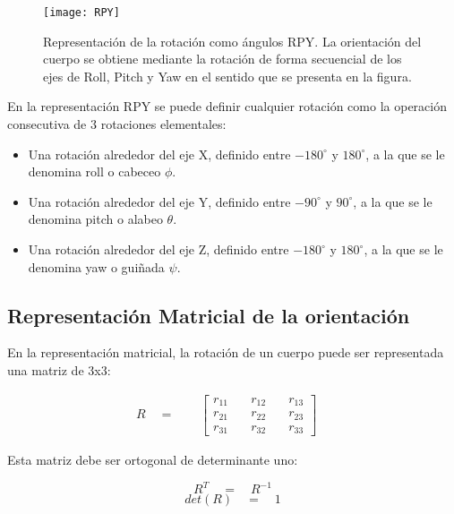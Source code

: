 \begin{figure}[H]
	\centering
	\texttt{[image: RPY]}
	\caption[Representación de la rotación como ángulos  RPY]{Representación de la rotación como ángulos RPY. La orientación del cuerpo se obtiene mediante la rotación de forma secuencial de los ejes de Roll, Pitch y Yaw en el sentido que se presenta en la figura.}
	\label{imagen:rpy}
\end{figure} 

En la representación RPY se puede definir cualquier rotación como la operación consecutiva de 3 rotaciones elementales:



\begin{itemize}
	\item Una rotación alrededor del eje X, definido entre ${-180}^{\circ }$ y ${180}^{\circ }$, a la que se le denomina roll o cabeceo $ \phi$. 
	\item Una rotación alrededor del eje Y, definido entre ${-90}^{\circ }$ y  ${90}^{\circ }$, a la que se le denomina pitch o alabeo $\theta$.
	\item Una rotación alrededor del eje Z, definido entre ${-180}^{\circ }$ y ${180}^{\circ }$, a la que se le denomina yaw o guiñada $\psi$.
	
	
\end{itemize}

\subsection{ Representación Matricial de la orientación }

En la representación matricial, la rotación de un cuerpo puede ser representada una matriz de 3x3:

\begin{equation}
\begin{matrix} R\quad =\quad \quad \begin{bmatrix} { r }_{ 11 } & { \quad r }_{ 12 } & { \quad r }_{ 13 } \\ { r }_{ 21 } & { \quad r }_{ 22 } & { \quad r }_{ 23 } \\ { r }_{ 31 } & { \quad r }_{ 32 } & { \quad r }_{ 33 } \end{bmatrix}\quad  \end{matrix}
\label{eq:MatrizRotacion}
\end{equation}

Esta matriz debe ser ortogonal de determinante uno:

\begin{equation}
{ R }^{ T }\quad =\quad { R }^{ -1 }
\label{eq:Propiedad1MatrizRotacion}
\end{equation}
\begin{equation}
det(R)\quad =\quad 1
\label{eq:Propiedad2MatrizRotacion}
\end{equation}


